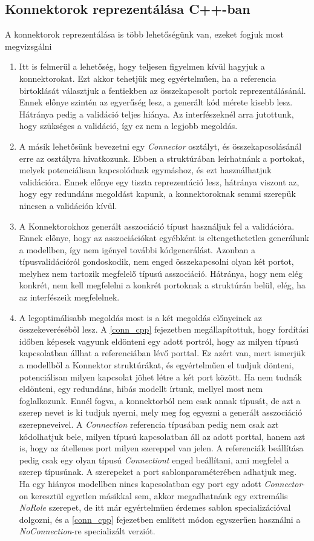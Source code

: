 \documentclass[a4paper,12pt]{report}
\begin{document}
\subsection{Konnektorok reprezentálása C++-ban}
A konnektorok reprezentálása is több lehetőségünk van, ezeket fogjuk most megvizsgálni
\begin{enumerate}
\item Itt is felmerül a lehetőség, hogy teljesen figyelmen kívül hagyjuk a konnektorokat. Ezt akkor tehetjük meg egyértelműen, ha a referencia birtoklását választjuk a fentiekben az összekapcsolt portok reprezentálásánál. Ennek előnye szintén az egyerűség lesz, a generált kód mérete kisebb lesz. Hátránya pedig a validáció teljes hiánya. Az interfészeknél arra jutottunk, hogy szükséges a validáció, így ez nem a legjobb megoldás.
\item A másik lehetősünk bevezetni egy \textit{Connector} osztályt, és összekapcsolásánál erre az osztályra hivatkozunk. Ebben a struktúrában leírhatnánk a portokat, melyek potenciálisan kapcsolódnak egymáshoz, és ezt használhatjuk validációra. Ennek előnye egy tiszta reprezentáció lesz, hátránya viszont az, hogy egy redundáns megoldást kapunk, a konnektoroknak semmi szerepük nincsen a validáción kívül.
\item A Konnektorokhoz generált asszociáció típust használjuk fel a validációra. Ennek előnye, hogy az asszociációkat egyébként is eltengethetetlen generálunk a modellben, így nem igényel további kódgenerálást. Azonban a típusvalidációról gondoskodik, nem enged összekapcsolni olyan két portot, melyhez nem tartozik megfelelő típusú asszociáció. Hátránya, hogy nem elég konkrét, nem kell megfelelni a konkrét portoknak a struktúrán belül, elég, ha az interfészeik megfelelnek.
\item A legoptimálisabb megoldás most is a két megoldás előnyeinek az összekeveréséből lesz. A \ref{conn_cpp} fejezetben megállapítottuk, hogy fordítási időben képesek vagyunk eldönteni egy adott portról, hogy az milyen típusú kapcsolatban állhat a referenciában lévő porttal. Ez azért van, mert ismerjük a modellből a Konnektor struktúrákat, és egyértelműen el tudjuk dönteni, potenciálisan milyen kapcsolat jöhet létre a két port között. Ha nem tudnák eldönteni, egy redundáns, hibás modellt írtunk, mellyel most nem foglalkozunk. Ennél fogva, a konnektorból nem csak annak típusát, de azt a szerep nevet is ki tudjuk nyerni, mely meg fog egyezni a generált asszociáció szerepneveivel. A \textit{Connection} referencia típusában pedig nem csak azt kódolhatjuk bele, milyen típusú kapcsolatban áll az adott porttal, hanem azt is, hogy az átellenes port milyen szereppel van jelen. A referenciák beállítása pedig csak egy olyan típusú \textit{Connectiont} enged beállítani, ami megfelel a szerep típusúnak. A szerepeket a port sablonparaméterében adhatjuk meg. Ha egy hiányos modellben nincs kapcsolatban egy port egy adott \textit{Connector}-on keresztül egyetlen másikkal sem, akkor megadhatnánk egy extremális \textit{NoRole} szerepet, de itt már egyértelműen érdemes sablon specializációval dolgozni, és a \ref{conn_cpp} fejezetben említett módon egyszerűen használni a \textit{NoConnection}-re specializált verziót.  \\

\end{enumerate}
\end{document}
